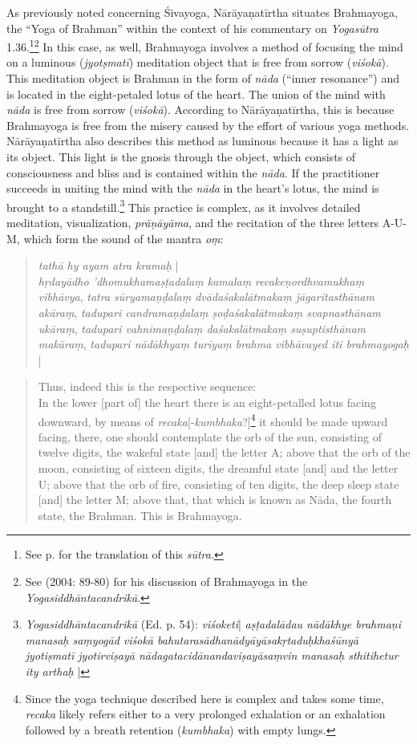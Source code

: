 As previously noted concerning Śivayoga, Nārāyaṇatīrtha situates Brahmayoga, the ``Yoga of Brahman'' within the context of his commentary on \textit{Yogasūtra} 1.36.\footnote{See p. \pageref{sivayogacandri} for the translation of this \textit{sūtra}.}\footnote{See \citeauthor{penna2004} (2004: 89-80) for his discussion of Brahmayoga in the \textit{Yogasiddhāntacandrikā}.} In this case, as well, Brahmayoga involves a method of focusing the mind on a luminous (\textit{jyotṣmatī}) meditation object that is free from sorrow (\textit{viśokā}). This meditation object is Brahman in the form of \textit{nāda} (``inner resonance'') and is located in the eight-petaled lotus of the heart. The union of the mind with \textit{nāda} is free from sorrow (\textit{viśokā}). According to Nārāyaṇatīrtha, this is because Brahmayoga is free from the misery caused by the effort of various yoga methods. Nārāyaṇatīrtha also describes this method as luminous because it has a light as its object. This light is the gnosis through the object, which consists of consciousness and bliss and is contained within the \textit{nāda}. If the practitioner succeeds in uniting the mind with the \textit{nāda} in the heart's lotus, the mind is brought to a standstill.\footnote{\textit{Yogasiddhāntacandrikā} (Ed. p. 54): \textit{viśoketi}| \textit{aṣṭadalādau nādākhye brahmaṇi manasaḥ saṃyogād viśokā bahutarasādhanādyāyāsakṛtaduḥkhaśūnyā jyotiṣmatī jyotirviṣayā nādagatacidānandaviṣayāsaṃvin manasaḥ sthitihetur ity arthaḥ} |}
This practice is complex, as it involves detailed meditation, visualization, \textit{prāṇāyāma}, and the recitation of the three letters A-U-M, which form the sound of the mantra \textit{oṃ}:

\begin{quote}
\textit{tathā hy ayam atra kramaḥ} |\\ \textit{hṛdayādho 'dhomukhamaṣṭadalaṃ kamalaṃ recakeṇordhvamukhaṃ vibhāvya}, \textit{tatra sūryamaṇḍalaṃ dvādaśakalātmakaṃ jāgaritasthānam akāraṃ},
\textit{tadupari candramaṇḍalaṃ ṣoḍaśakalātmakaṃ svapnasthānam ukāraṃ}, \textit{tadupari vahnimaṇḍalaṃ daśakalātmakaṃ suṣuptisthānam makāraṃ}, \textit{tadupari nādākhyaṃ turīyaṃ brahma vibhāvayed iti brahmayogaḥ} |
\end{quote}
\begin{quote}
Thus, indeed this is the respective sequence: \\
In the lower [part of] the heart there is an eight-petalled lotus facing downward, by means of \textit{recaka}[-\textit{kumbhaka}?]\footnote{Since the yoga technique described here is complex and takes some time, \textit{recaka} likely refers either to a very prolonged exhalation or an exhalation followed by a breath retention (\textit{kumbhaka}) with empty lungs.} it should be made upward facing, there, one should contemplate the orb of the sun, consisting of twelve digits, the wakeful state [and] the letter A; above that the orb of the moon, consisting of sixteen digits, the dreamful state [and] and the letter U; above that the orb of fire, consisting of ten digits, the deep sleep state [and] the letter M; above that, that which is known as Nāda, the fourth state, the Brahman. This is Brahmayoga. 
\end{quote}


